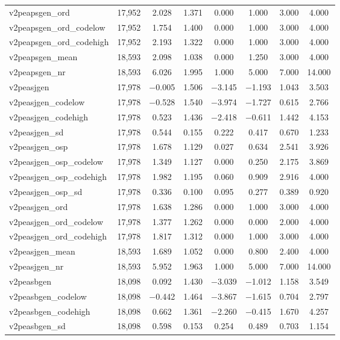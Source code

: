 \begin{table}[!htbp]
\begin{tabular}{@{\extracolsep{5pt}}lccccccc}
v2peapsgen\_ord & 17,952 & 2.028 & 1.371 & 0.000 & 1.000 & 3.000 & 4.000 \\ 
v2peapsgen\_ord\_codelow & 17,952 & 1.754 & 1.400 & 0.000 & 1.000 & 3.000 & 4.000 \\ 
v2peapsgen\_ord\_codehigh & 17,952 & 2.193 & 1.322 & 0.000 & 1.000 & 3.000 & 4.000 \\ 
v2peapsgen\_mean & 18,593 & 2.098 & 1.038 & 0.000 & 1.250 & 3.000 & 4.000 \\ 
v2peapsgen\_nr & 18,593 & 6.026 & 1.995 & 1.000 & 5.000 & 7.000 & 14.000 \\ 
v2peasjgen & 17,978 & $-$0.005 & 1.506 & $-$3.145 & $-$1.193 & 1.043 & 3.503 \\ 
v2peasjgen\_codelow & 17,978 & $-$0.528 & 1.540 & $-$3.974 & $-$1.727 & 0.615 & 2.766 \\ 
v2peasjgen\_codehigh & 17,978 & 0.523 & 1.436 & $-$2.418 & $-$0.611 & 1.442 & 4.153 \\ 
v2peasjgen\_sd & 17,978 & 0.544 & 0.155 & 0.222 & 0.417 & 0.670 & 1.233 \\ 
v2peasjgen\_osp & 17,978 & 1.678 & 1.129 & 0.027 & 0.634 & 2.541 & 3.926 \\ 
v2peasjgen\_osp\_codelow & 17,978 & 1.349 & 1.127 & 0.000 & 0.250 & 2.175 & 3.869 \\ 
v2peasjgen\_osp\_codehigh & 17,978 & 1.982 & 1.195 & 0.060 & 0.909 & 2.916 & 4.000 \\ 
v2peasjgen\_osp\_sd & 17,978 & 0.336 & 0.100 & 0.095 & 0.277 & 0.389 & 0.920 \\ 
v2peasjgen\_ord & 17,978 & 1.638 & 1.286 & 0.000 & 1.000 & 3.000 & 4.000 \\ 
v2peasjgen\_ord\_codelow & 17,978 & 1.377 & 1.262 & 0.000 & 0.000 & 2.000 & 4.000 \\ 
v2peasjgen\_ord\_codehigh & 17,978 & 1.817 & 1.312 & 0.000 & 1.000 & 3.000 & 4.000 \\ 
v2peasjgen\_mean & 18,593 & 1.689 & 1.052 & 0.000 & 0.800 & 2.400 & 4.000 \\ 
v2peasjgen\_nr & 18,593 & 5.952 & 1.963 & 1.000 & 5.000 & 7.000 & 14.000 \\ 
v2peasbgen & 18,098 & 0.092 & 1.430 & $-$3.039 & $-$1.012 & 1.158 & 3.549 \\ 
v2peasbgen\_codelow & 18,098 & $-$0.442 & 1.464 & $-$3.867 & $-$1.615 & 0.704 & 2.797 \\ 
v2peasbgen\_codehigh & 18,098 & 0.662 & 1.361 & $-$2.260 & $-$0.415 & 1.670 & 4.257 \\ 
v2peasbgen\_sd & 18,098 & 0.598 & 0.153 & 0.254 & 0.489 & 0.703 & 1.154 \\ 

\end{tabular}
\end{table}
